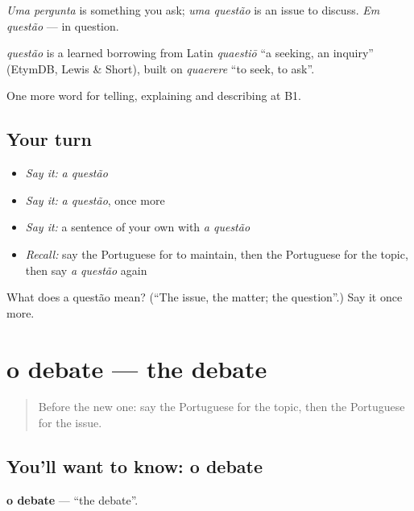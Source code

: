 \emph{Uma pergunta} is something you ask; \emph{uma questão} is an issue to discuss. \emph{Em questão} — in question.

\begin{cousinweb}
\emph{questão} is a learned borrowing from Latin \emph{quaestiō} \textquotedblleft{}a seeking, an inquiry\textquotedblright{} (EtymDB, Lewis \& Short), built on \emph{quaerere} \textquotedblleft{}to seek, to ask\textquotedblright{}.
\end{cousinweb}

\begin{grammarlens}[title={What you've built}]
One more word for telling, explaining and describing at B1.
\end{grammarlens}

\subsection*{Your turn}
\begin{itemize}
\raggedright
  \item \emph{Say it:} \emph{a questão}
  \item \emph{Say it:} \emph{a questão}, once more
  \item \emph{Say it:} a sentence of your own with \emph{a questão}
  \item \emph{Recall:} say the Portuguese for to maintain, then the Portuguese for the topic, then say \emph{a questão} again
\end{itemize}

\begin{tcolorbox}[breakable,colback=teal!4,colframe=teal!35!black,title={Before you move on}]
What does a questão mean? (\textquotedblleft{}The issue, the matter; the question\textquotedblright{}.) Say it once more.
\end{tcolorbox}
\section[o debate]{o debate — the debate}

\label{lesson:PT-C336-debate}



\begin{quote}
Before the new one: say the Portuguese for the topic, then the Portuguese for the issue.
\end{quote}

\subsection*{You'll want to know: o debate}
\textbf{o debate} — \textquotedblleft{}the debate\textquotedblright{}.

